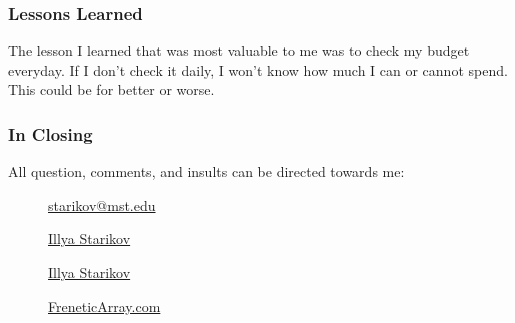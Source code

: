 \documentclass[xclolor=dvipsnames]{beamer}            %
\begin{document}
\begin{darkframes}
    \begin{frame}
        \frametitle{Lessons Learned}

        The lesson I learned that was most valuable to me was to check my budget everyday. If I don't check it daily, I won't know how much I can or cannot spend. This could be for better or worse.

    \end{frame}

    \begin{frame}
        \frametitle{In Closing}

        All question, comments, and insults can be directed towards me:

        \begin{center}
            \begin{description}
                \item[\faComment] \href{mailto:starikov@mst.edu}{starikov@mst.edu}
                \item[\faLinkedin] \href{https://www.linkedin.com/in/illyastarikov/}{Illya Starikov}
                \item[\faGithub] \href{https://github.com/IllyaStarikov/}{Illya Starikov}
                \item[\faRss] \href{https://freneticarray.com/}{FreneticArray.com}
            \end{description}
        \end{center}
    \end{frame}
\end{darkframes}
\end{document}
